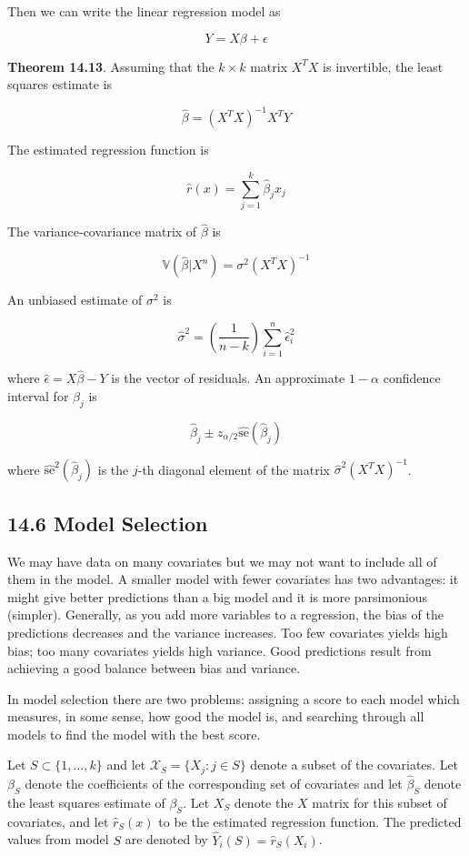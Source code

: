 Then we can write the linear regression model as

\[ Y = X \beta + \epsilon \]

\textbf{Theorem 14.13}. Assuming that the \(k \times k\) matrix \(X^TX\)
is invertible, the least squares estimate is

\[ \hat{\beta} = (X^T X)^{-1} X^T Y \]

The estimated regression function is

\[ \hat{r}(x) = \sum_{j=1}^{k} \hat{\beta}_{j} x_{j}\]

The variance-covariance matrix of \(\hat{\beta}\) is

\[ \mathbb{V}(\hat{\beta} | X^{n}) = \sigma^{2} (X^T X)^{-1} \]

An unbiased estimate of \(\sigma^{2}\) is

\[ \hat{\sigma}^{2} = \left( \frac{1}{n - k} \right) \sum_{i=1}^{n} \hat{\epsilon}_{i}^{2} \]

where \(\hat{\epsilon} = X \hat{\beta} - Y\) is the vector of residuals.
An approximate \(1 - \alpha\) confidence interval for \(\beta_{j}\) is

\[ \hat{\beta}_{j} \pm z_{\alpha/2} \hat{\text{se}}(\hat{\beta}_{j}) \]

where \(\hat{\text{se}}^{2}(\hat{\beta}_{j})\) is the \(j\)-th diagonal
element of the matrix \(\hat{\sigma}^{2} (X^T X)^{-1}\).

\subsection*{14.6 Model Selection}\label{model-selection}

We may have data on many covariates but we may not want to include all
of them in the model. A smaller model with fewer covariates has two
advantages: it might give better predictions than a big model and it is
more parsimonious (simpler). Generally, as you add more variables to a
regression, the bias of the predictions decreases and the variance
increases. Too few covariates yields high bias; too many covariates
yields high variance. Good predictions result from achieving a good
balance between bias and variance.

In model selection there are two problems: assigning a score to each
model which measures, in some sense, how good the model is, and
searching through all models to find the model with the best score.

Let \(S \subset \{1, \dots, k\}\) and let
\(\mathcal{X}_S = \{ X_{j} : j \in S \}\) denote a subset of the
covariates. Let \(\beta_S\) denote the coefficients of the corresponding
set of covariates and let \(\hat{\beta}_S\) denote the least squares
estimate of \(\beta_S\). Let \(X_S\) denote the \(X\) matrix for this
subset of covariates, and let \(\hat{r}_S(x)\) to be the estimated
regression function. The predicted values from model \(S\) are denoted
by \(\hat{Y}_{i}(S) = \hat{r}_S(X_{i})\).

